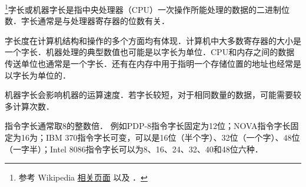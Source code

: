 
\begin{issues}
\issueDraft
\end{issues}

\footnote{参考 Wikipedia \href{https://en.wikipedia.org/wiki/Word_(computer_architecture)}{相关页面} 以及 \cite{唐计}．}字长或机器字长是指中央处理器（CPU）一次操作所能处理的数据的二进制位数．字长通常是与处理器寄存器的位数有关．

字长度在计算机结构和操作的多个方面均有体现．计算机中大多数寄存器的大小是一个字长．机器处理的典型数值也可能是以字长为单位．CPU和内存之间的数据传送单位也通常是一个字长．还有在内存中用于指明一个存储位置的地址也经常是以字长为单位的．

机器字长会影响机器的运算速度．若字长较短，对于相同数量的数据，可能需要较多计算次数．

指令字长通常取8的整数倍．
例如PDP-8指令字长固定为12位；NOVA指令字长固定为16为；IBM 370指令字长可变，可以是16位（半个字）、32位（一个字）、48位（一字半）；Intel 8086指令字长可以为8、16、24、32、40和48位六种．